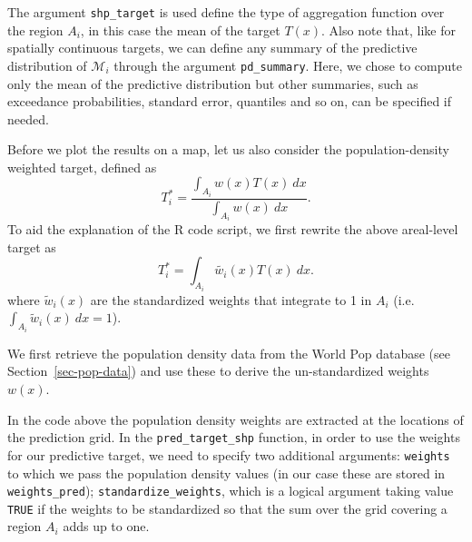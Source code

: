 \documentclass[
  letterpaper,
]{krantz}
\newenvironment{Shaded}{\begin{snugshade}}{\end{snugshade}}
\newcommand{\AttributeTok}[1]{\textcolor[rgb]{0.13,0.29,0.53}{#1}}
\newcommand{\CommentTok}[1]{\textcolor[rgb]{0.56,0.35,0.01}{\textit{#1}}}
\newcommand{\FunctionTok}[1]{\textcolor[rgb]{0.13,0.29,0.53}{\textbf{#1}}}
\newcommand{\NormalTok}[1]{#1}
\newcommand{\OtherTok}[1]{\textcolor[rgb]{0.56,0.35,0.01}{#1}}
\newcommand{\SpecialCharTok}[1]{\textcolor[rgb]{0.81,0.36,0.00}{\textbf{#1}}}
\newcommand{\StringTok}[1]{\textcolor[rgb]{0.31,0.60,0.02}{#1}}
\begin{document}
The argument \texttt{shp\_target} is used define the type of aggregation
function over the region \(A_i\), in this case the mean of the target
\(T(x)\). Also note that, like for spatially continuous targets, we can
define any summary of the predictive distribution of \(\mathcal{M}_i\)
through the argument \texttt{pd\_summary}. Here, we chose to compute
only the mean of the predictive distribution but other summaries, such
as exceedance probabilities, standard error, quantiles and so on, can be
specified if needed.

Before we plot the results on a map, let us also consider the
population-density weighted target, defined as \[
T_{i}^* = \frac{ \int_{A_i} w(x) T(x) \: dx}{\int_{A_i} w(x) \: dx}.
\] To aid the explanation of the R code script, we first rewrite the
above areal-level target as \[
T_{i}^* = \int_{A_i} \tilde{w_i}(x) T(x) \: dx.
\] where \(\tilde{w}_{i}(x)\) are the standardized weights that
integrate to 1 in \(A_i\)
(i.e.~\(\int_{A_i} \tilde{w}_i(x) \: dx = 1\)).

We first retrieve the population density data from the World Pop
database (see Section~\ref{sec-pop-data}) and use these to derive the
un-standardized weights \(w(x)\).

\begin{Shaded}
\end{Shaded}

In the code above the population density weights are extracted at the
locations of the prediction grid. In the \texttt{pred\_target\_shp}
function, in order to use the weights for our predictive target, we need
to specify two additional arguments: \texttt{weights} to which we pass
the population density values (in our case these are stored in
\texttt{weights\_pred}); \texttt{standardize\_weights}, which is a
logical argument taking value \texttt{TRUE} if the weights to be
standardized so that the sum over the grid covering a region \(A_i\)
adds up to one.
\end{document}
